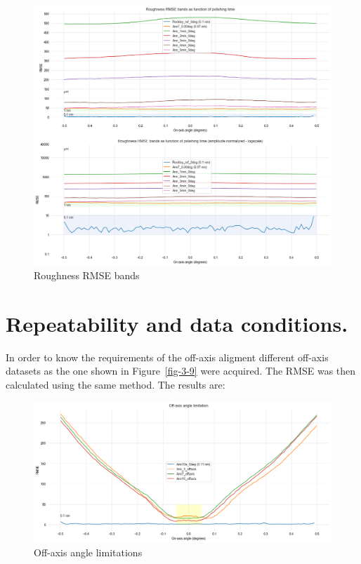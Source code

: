\documentclass[
  letterpaper,
  DIV=11,
  numbers=noendperiod,
  oneside]{scrreprt}
\begin{document}
\begin{figure}

{\centering \includegraphics{notebooks/d_RMSE_files/figure-pdf/fig-5-3-output-1.png}

}

\caption{\label{fig-5-3}Roughness RMSE bands}

\end{figure}

\hypertarget{repeatability-and-data-conditions.}{%
\section{Repeatability and data
conditions.}\label{repeatability-and-data-conditions.}}

In order to know the requirements of the off-axis aligment different
off-axis datasets as the one shown in Figure~\ref{fig-3-9} were
acquired. The RMSE was then calculated using the same method. The
results are:

\begin{figure}

{\centering \includegraphics{notebooks/d_RMSE_files/figure-pdf/fig-5-4-output-1.png}

}

\caption{\label{fig-5-4}Off-axis angle limitations}

\end{figure}
\end{document}
